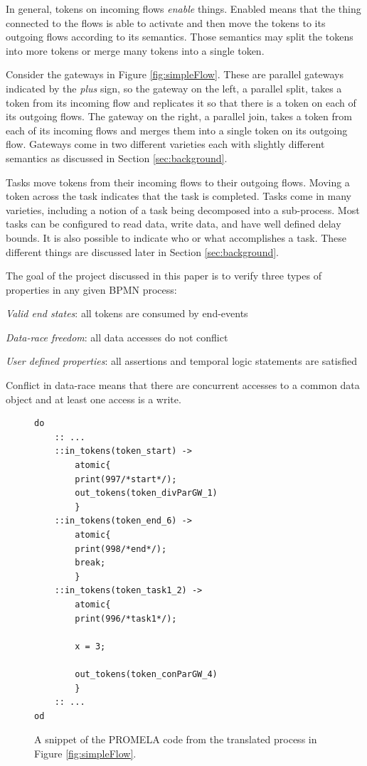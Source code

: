 \documentclass[11pt,twocolumn]{article}
\begin{document}
In general, tokens on incoming flows \emph{enable} things. Enabled means that the thing connected to the flows is able to activate and then move the tokens to its outgoing flows according to its semantics. Those semantics may split the tokens into more tokens or merge many tokens into a single token.  

Consider the gateways in Figure \ref{fig:simpleFlow}. These are parallel gateways indicated by the \emph{plus} sign, so the gateway on the left, a parallel split, takes a token from its incoming flow and replicates it so that there is a token on each of its outgoing flows. The gateway on the right, a parallel join, takes a token from each of its incoming flows and merges them into a single token on its outgoing flow. Gateways come in two different varieties each with slightly different semantics as discussed in Section \ref{sec:background}. 

Tasks move tokens from their incoming flows to their outgoing flows. Moving a token across the task indicates that the task is completed. Tasks come in many varieties, including a notion of a task being decomposed into a sub-process. Most tasks can be configured to read data, write data, and have well defined delay bounds. It is also possible to indicate who or what accomplishes a task. These different things are discussed later in Section \ref{sec:background}. 

The goal of the project discussed in this paper is to verify three types of properties in any given BPMN process:
\begin{compactitem}
\item \emph{Valid end states}: all tokens are consumed by end-events
\item \emph{Data-race freedom}: all data accesses do not conflict
\item \emph{User defined properties}: all assertions and temporal logic statements are satisfied 
\end{compactitem}
Conflict in data-race means that there are concurrent accesses to a common data object and at least one access is a write. 

\begin{figure}[t]

\begin{lstlisting}
do
	:: ...
	::in_tokens(token_start) -> 
		atomic{
		print(997/*start*/);
		out_tokens(token_divParGW_1)
		}
	::in_tokens(token_end_6) -> 
		atomic{
		print(998/*end*/);
		break;
		}
	::in_tokens(token_task1_2) -> 
		atomic{
		print(996/*task1*/);
		
		x = 3;
		
		out_tokens(token_conParGW_4)
		}
	:: ...
od
\end{lstlisting}

\caption{A snippet of the PROMELA code from the translated process in Figure \ref{fig:simpleFlow}.}
\label{fig:promelaSmall}
\end{figure}
\end{document}
